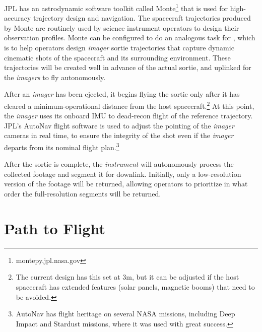 \documentclass{tufte-handout}
\begin{document}
JPL has an astrodynamic software toolkit called Monte\footnote{montepy.jpl.nasa.gov} 
that is used for high-accuracy trajectory design and navigation. The spacecraft 
trajectories produced by Monte are routinely used by science instrument operators to design 
their observation profiles. Monte can be configured to do an analogous task for
\sitsshort, which is to help operators design \textit{imager} sortie trajectories that 
capture dynamic cinematic shots of the spacecraft and its surrounding environment.
These trajectories will be created well in advance of the actual sortie, and 
uplinked for the \textit{imagers} to fly autonomously. 

After an \textit{imager} has been ejected, it begins flying the sortie only after it
has cleared a minimum-operational distance from the host spacecraft.\footnote{The current
design has this set at 3m, but it can be adjusted if the host spacecraft
has extended features (solar panels, magnetic booms) that need to be 
avoided.} At this point, the \textit{imager} uses its onboard IMU to dead-recon flight
of the reference trajectory. JPL's AutoNav flight software is used to adjust
the pointing of the \textit{imager} cameras in real time, to ensure the integrity of
the shot even if the \textit{imager} departs from its nominal flight plan.\footnote{AutoNav has 
flight heritage on several NASA missions, including Deep Impact and Stardust missions, where it was used with great 
success.} 

After the sortie is complete, the \textit{instrument} will autonomously process the collected
footage and segment it for downlink. Initially, only a low-resolution version of the
footage will be returned, allowing operators to prioritize in what order the 
full-resolution segments will be returned.

\clearpage
\section{Path to Flight}

\end{document}
